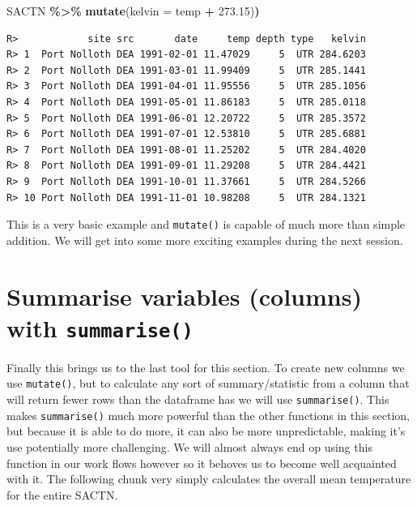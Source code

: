 \documentclass[
]{book}
\newenvironment{Shaded}{\begin{snugshade}}{\end{snugshade}}
\newcommand{\DataTypeTok}[1]{\textcolor[rgb]{0.13,0.29,0.53}{#1}}
\newcommand{\ErrorTok}[1]{\textcolor[rgb]{0.64,0.00,0.00}{\textbf{#1}}}
\newcommand{\FloatTok}[1]{\textcolor[rgb]{0.00,0.00,0.81}{#1}}
\newcommand{\KeywordTok}[1]{\textcolor[rgb]{0.13,0.29,0.53}{\textbf{#1}}}
\newcommand{\NormalTok}[1]{#1}
\newcommand{\OperatorTok}[1]{\textcolor[rgb]{0.81,0.36,0.00}{\textbf{#1}}}
\newcommand{\StringTok}[1]{\textcolor[rgb]{0.31,0.60,0.02}{#1}}
\begin{document}
\begin{Shaded}
\begin{Highlighting}[]
\NormalTok{SACTN }\OperatorTok{\%>\%}\StringTok{ }
\StringTok{  }\KeywordTok{mutate}\NormalTok{(}\DataTypeTok{kelvin =}\NormalTok{ temp }\OperatorTok{+}\StringTok{ }\FloatTok{273.15}\NormalTok{)}\ErrorTok{)}
\end{Highlighting}
\end{Shaded}

\begin{verbatim}
R>            site src       date     temp depth type   kelvin
R> 1  Port Nolloth DEA 1991-02-01 11.47029     5  UTR 284.6203
R> 2  Port Nolloth DEA 1991-03-01 11.99409     5  UTR 285.1441
R> 3  Port Nolloth DEA 1991-04-01 11.95556     5  UTR 285.1056
R> 4  Port Nolloth DEA 1991-05-01 11.86183     5  UTR 285.0118
R> 5  Port Nolloth DEA 1991-06-01 12.20722     5  UTR 285.3572
R> 6  Port Nolloth DEA 1991-07-01 12.53810     5  UTR 285.6881
R> 7  Port Nolloth DEA 1991-08-01 11.25202     5  UTR 284.4020
R> 8  Port Nolloth DEA 1991-09-01 11.29208     5  UTR 284.4421
R> 9  Port Nolloth DEA 1991-10-01 11.37661     5  UTR 284.5266
R> 10 Port Nolloth DEA 1991-11-01 10.98208     5  UTR 284.1321
\end{verbatim}

This is a very basic example and \texttt{mutate()} is capable of much more than simple addition. We will get into some more exciting examples during the next session.

\hypertarget{summarise-variables-columns-with-summarise}{%
\section{\texorpdfstring{Summarise variables (columns) with \texttt{summarise()}}{Summarise variables (columns) with summarise()}}\label{summarise-variables-columns-with-summarise}}

Finally this brings us to the last tool for this section. To create new columns we use \texttt{mutate()}, but to calculate any sort of summary/statistic from a column that will return fewer rows than the dataframe has we will use \texttt{summarise()}. This makes \texttt{summarise()} much more powerful than the other functions in this section, but because it is able to do more, it can also be more unpredictable, making it's use potentially more challenging. We will almost always end op using this function in our work flows however so it behoves us to become well acquainted with it. The following chunk very simply calculates the overall mean temperature for the entire SACTN.
\end{document}

